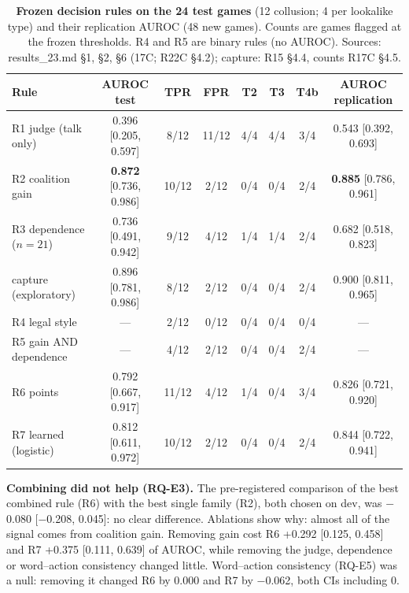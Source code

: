 \documentclass[conference]{IEEEtran}
\begin{document}
\begin{table}[t]
\centering\small\setlength{\tabcolsep}{5pt}
\caption{\textbf{Frozen decision rules on the 24 test games} (12 collusion; 4 per lookalike type) and their
replication AUROC (48 new games). Counts are games flagged at the frozen thresholds. R4 and R5 are binary rules
(no AUROC). Sources: results\_23.md \S1, \S2, \S6 (17C; R22C \S4.2); capture: R15 \S4.4, counts R17C \S4.5.}
\label{tab:rules}
\begin{tabular}{@{}lccccccc@{}}
\toprule
Rule & AUROC test & TPR & FPR & T2 & T3 & T4b & AUROC replication\\
\midrule
R1 judge (talk only)        & 0.396 [0.205, 0.597] & 8/12 & 11/12 & 4/4 & 4/4 & 3/4 & 0.543 [0.392, 0.693]\\
R2 coalition gain           & \textbf{0.872} [0.736, 0.986] & 10/12 & 2/12 & 0/4 & 0/4 & 2/4 & \textbf{0.885} [0.786, 0.961]\\
R3 dependence ($n=21$)      & 0.736 [0.491, 0.942] & 9/12 & 4/12 & 1/4 & 1/4 & 2/4 & 0.682 [0.518, 0.823]\\
capture (exploratory)       & 0.896 [0.781, 0.986] & 8/12 & 2/12 & 0/4 & 0/4 & 2/4 & 0.900 [0.811, 0.965]\\
\midrule
R4 legal style              & ---  & 2/12 & 0/12 & 0/4 & 0/4 & 0/4 & ---\\
R5 gain AND dependence      & ---  & 4/12 & 2/12 & 0/4 & 0/4 & 2/4 & ---\\
R6 points                   & 0.792 [0.667, 0.917] & 11/12 & 4/12 & 1/4 & 0/4 & 3/4 & 0.826 [0.721, 0.920]\\
R7 learned (logistic)       & 0.812 [0.611, 0.972] & 10/12 & 2/12 & 0/4 & 0/4 & 2/4 & 0.844 [0.722, 0.941]\\
\bottomrule
\end{tabular}
\end{table}

\textbf{Combining did not help (RQ-E3).} The pre-registered comparison of the best combined rule (R6) with the best
single family (R2), both chosen on dev, was $-$0.080 [$-$0.208, 0.045]: no clear difference. Ablations show why:
almost all of the signal comes from coalition gain. Removing gain cost R6 +0.292 [0.125, 0.458] and R7 +0.375
[0.111, 0.639] of AUROC, while removing the judge, dependence or word--action consistency changed little. Word--action
consistency (RQ-E5) was a null: removing it changed R6 by 0.000 and R7 by $-$0.062, both CIs including 0.
\end{document}
